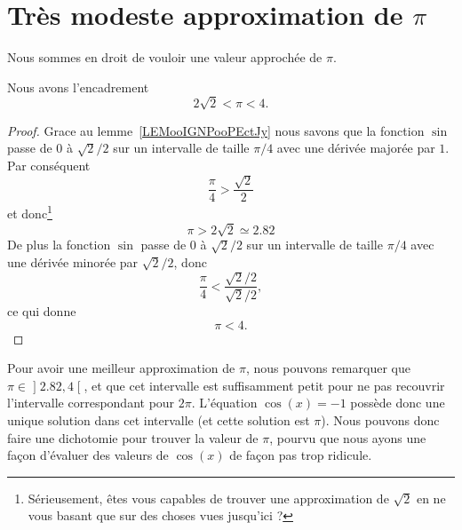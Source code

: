 
\section{Très modeste approximation de \texorpdfstring{\(  \pi\)}{pi}}

Nous sommes en droit de vouloir une valeur approchée de \( \pi\).
\begin{lemma}       \label{LEMooJWSGooExmtDA}
	Nous avons l'encadrement
	\begin{equation}
		2\sqrt{ 2 }<\pi<4.
	\end{equation}
\end{lemma}

\begin{proof}
	Grace au lemme~\ref{LEMooIGNPooPEctJy} nous savons que la fonction \( \sin\) passe de \( 0\) à \( \sqrt{ 2 }/2\) sur un intervalle de taille \( \pi/4\) avec une dérivée majorée par \( 1\). Par conséquent
	\begin{equation}
		\frac{ \pi }{ 4 }>\frac{ \sqrt{ 2 } }{2}
	\end{equation}
	et donc\footnote{Sérieusement, êtes vous capables de trouver une approximation de \( \sqrt{ 2 }\) en ne vous basant que sur des choses vues jusqu'ici ?}
	\begin{equation}
		\pi>2\sqrt{ 2 }\simeq 2.82
	\end{equation}
	De plus la fonction \( \sin\) passe de \( 0\) à \( \sqrt{ 2 }/2\) sur un intervalle de taille \( \pi/4\) avec une dérivée minorée par \( \sqrt{ 2 }/2\), donc
	\begin{equation}
		\frac{ \pi }{ 4 }<\frac{ \sqrt{ 2 }/2 }{ \sqrt{ 2 }/2 },
	\end{equation}
	ce qui donne
	\begin{equation}
		\pi<4.
	\end{equation}
\end{proof}


Pour avoir une meilleur approximation de \( \pi\), nous pouvons remarquer que \( \pi\in\mathopen\rbrack 2.82 , 4 \mathclose\lbrack\), et que cet intervalle est suffisamment petit pour ne pas recouvrir l'intervalle correspondant pour \( 2\pi\). L'équation \( \cos(x)=-1\) possède donc une unique solution dans cet intervalle (et cette solution est \( \pi\)). Nous pouvons donc faire une dichotomie pour trouver la valeur de \( \pi\), pourvu que nous ayons une façon d'évaluer des valeurs de \( \cos(x)\) de façon pas trop ridicule.

